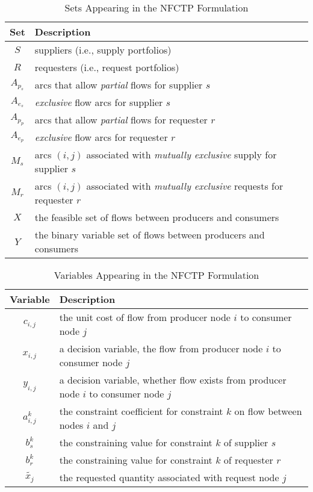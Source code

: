 \begin{table} [h!]
\centering
\begin{tabularx}{\columnwidth-10pt}{|c|X|} %
\hline
Set         & Description \\
\hline
$S$     & suppliers (i.e., supply portfolios) \\
$R$     & requesters (i.e., request portfolios) \\
$A_{p_s}$     & arcs that allow \textit{partial} flows for supplier $s$ \\
$A_{e_s}$     & \textit{exclusive} flow arcs for supplier $s$ \\
$A_{p_p}$     & arcs that allow \textit{partial} flows for requester $r$ \\
$A_{e_p}$     & \textit{exclusive} flow arcs for requester $r$ \\
$M_s$     & arcs $(i, j)$ associated with \textit{mutually exclusive} supply for supplier $s$ \\
$M_r$     & arcs $(i, j)$ associated with \textit{mutually exclusive} requests for requester $r$ \\
$X$         & the feasible set of flows between producers and consumers  \\
$Y$         & the binary variable set of flows between producers and consumers  \\
\hline
\end{tabularx}
\caption{Sets Appearing in the NFCTP Formulation}
\label{tbl:NFCTP-sets}
\end{table}

\begin{table} [h!]
\centering
\begin{tabularx}{\columnwidth-10pt}{|c|X|} %
\hline
Variable    & Description \\
\hline
$c_{i,j}$             & the unit cost of flow
                          from producer node $i$ to consumer node $j$  \\
$x_{i,j}$             & a decision variable, the flow 
                          from producer node $i$ to consumer node $j$  \\
$y_{i,j}$             & a decision variable, whether flow exists 
                          from producer node $i$ to consumer node $j$  \\
$a_{i,j}^k$ & the constraint coefficient for constraint $k$ 
                          on flow between nodes $i$ and $j$  \\
$b_s^k$   & the constraining value for constraint $k$ of supplier $s$ \\
$b_r^k$   & the constraining value for constraint $k$ of requester $r$ \\
$\tilde{x_j}$ & the requested quantity associated with request node $j$ \\
\hline
\end{tabularx}
\caption{Variables Appearing in the NFCTP Formulation}
\label{tbl:NFCTP-vars}
\end{table}

